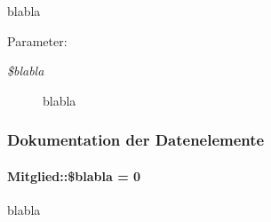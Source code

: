 blabla 

\begin{Desc}
\item[Parameter:]
\begin{description}
\item[{\em \$blabla}]blabla \end{description}
\end{Desc}


\subsubsection{Dokumentation der Datenelemente}
\hypertarget{classMitglied_8cf2e1dce2c0ae743bdc55af7252f7a7}{
\paragraph[\$blabla]{\setlength{\rightskip}{0pt plus 5cm}Mitglied::\$blabla = 0}\hfill}
\label{classMitglied_8cf2e1dce2c0ae743bdc55af7252f7a7}


blabla 

